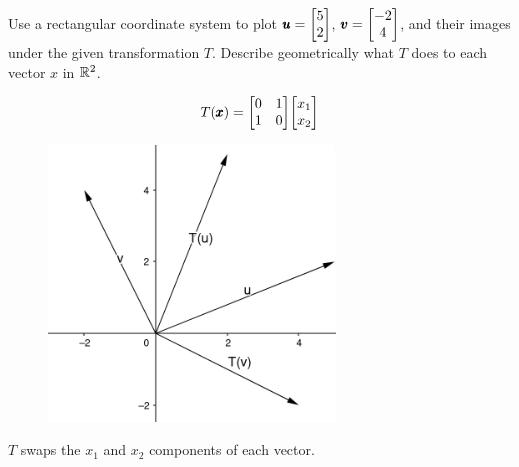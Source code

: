 \documentclass{../mathhomework}
\newenvironment{Mat}{\begin{bmatrix}}{\end{bmatrix}}
\begin{document}
\newpage

\begin{problem}[1.8\#16]
    Use a rectangular coordinate system to plot $\Vect{u} = \begin{Mat}
        5 \\ 2
    \end{Mat}$, $\Vect{v} = \begin{Mat}
        -2 \\ 4
    \end{Mat}$, and their images under the given transformation $T$. Describe geometrically what $T$ does to each vector $x$ in $\mathbb{R}^2$.

    \begin{equation*}
        T(\Vect{x}) = \begin{Mat}
            0 & 1 \\
            1 & 0
        \end{Mat}
        \begin{Mat}
            x_1 \\ x_2
        \end{Mat}
    \end{equation*}

    \begin{solution}
        \begin{figure}[h!]
            \begin{center}
                \includegraphics[width=3in]{figures/1_8_16_solution.png}
            \end{center}
        \end{figure}
    \end{solution}

    $T$ swaps the $x_1$ and $x_2$ components of each vector.
\end{problem}
\end{document}
